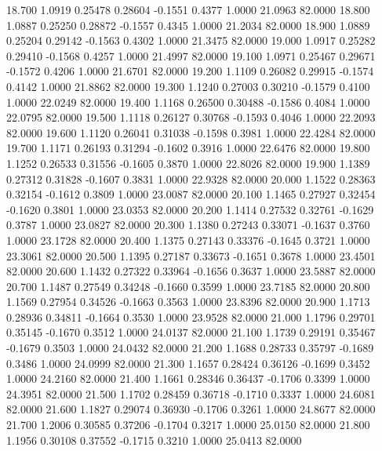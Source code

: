   18.700   1.0919   0.25478   0.28604  -0.1551   0.4377   1.0000  21.0963  82.0000
  18.800   1.0887   0.25250   0.28872  -0.1557   0.4345   1.0000  21.2034  82.0000
  18.900   1.0889   0.25204   0.29142  -0.1563   0.4302   1.0000  21.3475  82.0000
  19.000   1.0917   0.25282   0.29410  -0.1568   0.4257   1.0000  21.4997  82.0000
  19.100   1.0971   0.25467   0.29671  -0.1572   0.4206   1.0000  21.6701  82.0000
  19.200   1.1109   0.26082   0.29915  -0.1574   0.4142   1.0000  21.8862  82.0000
  19.300   1.1240   0.27003   0.30210  -0.1579   0.4100   1.0000  22.0249  82.0000
  19.400   1.1168   0.26500   0.30488  -0.1586   0.4084   1.0000  22.0795  82.0000
  19.500   1.1118   0.26127   0.30768  -0.1593   0.4046   1.0000  22.2093  82.0000
  19.600   1.1120   0.26041   0.31038  -0.1598   0.3981   1.0000  22.4284  82.0000
  19.700   1.1171   0.26193   0.31294  -0.1602   0.3916   1.0000  22.6476  82.0000
  19.800   1.1252   0.26533   0.31556  -0.1605   0.3870   1.0000  22.8026  82.0000
  19.900   1.1389   0.27312   0.31828  -0.1607   0.3831   1.0000  22.9328  82.0000
  20.000   1.1522   0.28363   0.32154  -0.1612   0.3809   1.0000  23.0087  82.0000
  20.100   1.1465   0.27927   0.32454  -0.1620   0.3801   1.0000  23.0353  82.0000
  20.200   1.1414   0.27532   0.32761  -0.1629   0.3787   1.0000  23.0827  82.0000
  20.300   1.1380   0.27243   0.33071  -0.1637   0.3760   1.0000  23.1728  82.0000
  20.400   1.1375   0.27143   0.33376  -0.1645   0.3721   1.0000  23.3061  82.0000
  20.500   1.1395   0.27187   0.33673  -0.1651   0.3678   1.0000  23.4501  82.0000
  20.600   1.1432   0.27322   0.33964  -0.1656   0.3637   1.0000  23.5887  82.0000
  20.700   1.1487   0.27549   0.34248  -0.1660   0.3599   1.0000  23.7185  82.0000
  20.800   1.1569   0.27954   0.34526  -0.1663   0.3563   1.0000  23.8396  82.0000
  20.900   1.1713   0.28936   0.34811  -0.1664   0.3530   1.0000  23.9528  82.0000
  21.000   1.1796   0.29701   0.35145  -0.1670   0.3512   1.0000  24.0137  82.0000
  21.100   1.1739   0.29191   0.35467  -0.1679   0.3503   1.0000  24.0432  82.0000
  21.200   1.1688   0.28733   0.35797  -0.1689   0.3486   1.0000  24.0999  82.0000
  21.300   1.1657   0.28424   0.36126  -0.1699   0.3452   1.0000  24.2160  82.0000
  21.400   1.1661   0.28346   0.36437  -0.1706   0.3399   1.0000  24.3951  82.0000
  21.500   1.1702   0.28459   0.36718  -0.1710   0.3337   1.0000  24.6081  82.0000
  21.600   1.1827   0.29074   0.36930  -0.1706   0.3261   1.0000  24.8677  82.0000
  21.700   1.2006   0.30585   0.37206  -0.1704   0.3217   1.0000  25.0150  82.0000
  21.800   1.1956   0.30108   0.37552  -0.1715   0.3210   1.0000  25.0413  82.0000
